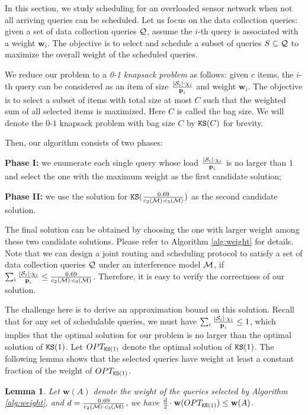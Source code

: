 \documentclass[conference,10pt]{IEEEtran}\usepackage{amsmath}
\newtheorem{lemma}{{Lemma}}
\def\sources{{\cal S}}
\def\processing{{\chi}}
\def\queryset{{\cal Q}}
\def\period{{\textbf p}}
\def\weight{\textbf{w}}
\def\qnum{{c}}
\begin{document}
In this section, we study scheduling for
 an overloaded sensor network when not all arriving
 queries can be scheduled.
Let us focus on the data collection queries: given a set of data
collection queries $\queryset$,
 assume the $i$-th query  is associated with a weight $\weight_i$.
The objective is to select and schedule a subset of queries
$S\subseteq \queryset$  to maximize the overall weight of the
scheduled queries.

We reduce our problem to a \emph{0-1 knapsack problem} as follows:
given $\qnum$ items,
 the $i$-th query can be considered as an item of size
$\frac{|\sources_i| \cdot \processing_i}{\period_i}$ and weight
$\weight_i$. The objective is to select a subset of items with total
size at most $C$ such that the weighted sum of all selected items is
maximized. Here $C$ is called the bag size. We will denote the
$0$-$1$ knapsack problem with bag size $C$ by
 $\texttt{KS}(C)$ for brevity.

Then, our algorithm consists of two phases:

\textbf{Phase I:} we enumerate each single query whose load
$\frac{|\sources_i| \cdot \processing_i}{\period_i}$ is no larger
than $1$ and select the one with the maximum weight as the first
candidate solution;

\textbf{Phase II:} we use the solution for
$\texttt{KS}(\frac{0.69}{c_2({\cal M})\cdot c_3({\cal M})})$ as the second
candidate solution.

The final solution can be obtained by choosing the one
 with larger weight among these two candidate solutions.
Please refer to Algorithm \ref{alg:weight} for details. Note that we
can design a joint routing and scheduling protocol to satisfy a set
of data collection queries $\queryset$ under an interference model
$\cal M$, if $ \sum_{i}
 \frac{|\sources_i| \cdot \processing_i}{\period_i} \le
 \frac{0.69}{c_2({\cal M})\cdot c_3({\cal M})}$.
Therefore, it is easy to verify the correctness of our solution.

The challenge here is to derive an approximation bound on this
solution. Recall that for any set of schedulable queries, we must
have $\sum_{i}
 \frac{|\sources_i| \cdot \processing_i}{\period_i}  \le 1$,
which implies that the optimal solution for our problem is no larger
than the optimal solution of $\texttt{KS}(1)$. Let $OPT_{\texttt{KS}(1)}$ denote
the optimal solution of $\texttt{KS}(1)$. The following lemma shows that
the selected queries have weight at least a constant fraction of the
weight of $OPT_{\texttt{KS}(1)}$.

\begin{lemma}\label{lem:weighted}
Let $\weight(A)$ denote the weight of the queries selected by
Algorithm \ref{alg:weight}, and $d=\frac{0.69}{c_2({\cal M})\cdot
c_3({\cal M})}$, we have
$\frac{d}{2}\cdot\weight(OPT_{\knap(1)})\leq \weight(A)$.
\end{lemma}
\end{document}
